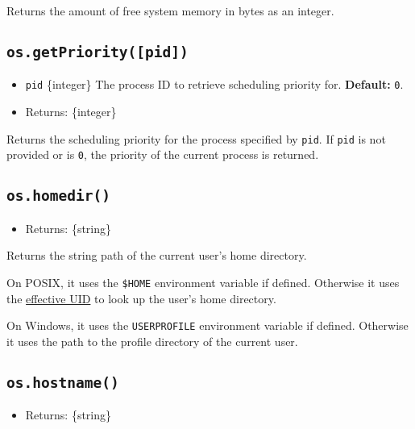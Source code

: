 Returns the amount of free system memory in bytes as an integer.

\subsection{\texorpdfstring{\texttt{os.getPriority({[}pid{]})}}{os.getPriority({[}pid{]})}}\label{os.getprioritypid}

\begin{itemize}
\tightlist
\item
  \texttt{pid} \{integer\} The process ID to retrieve scheduling
  priority for. \textbf{Default:} \texttt{0}.
\item
  Returns: \{integer\}
\end{itemize}

Returns the scheduling priority for the process specified by
\texttt{pid}. If \texttt{pid} is not provided or is \texttt{0}, the
priority of the current process is returned.

\subsection{\texorpdfstring{\texttt{os.homedir()}}{os.homedir()}}\label{os.homedir}

\begin{itemize}
\tightlist
\item
  Returns: \{string\}
\end{itemize}

Returns the string path of the current user's home directory.

On POSIX, it uses the \texttt{\$HOME} environment variable if defined.
Otherwise it uses the
\href{https://en.wikipedia.org/wiki/User_identifier\#Effective_user_ID}{effective
UID} to look up the user's home directory.

On Windows, it uses the \texttt{USERPROFILE} environment variable if
defined. Otherwise it uses the path to the profile directory of the
current user.

\subsection{\texorpdfstring{\texttt{os.hostname()}}{os.hostname()}}\label{os.hostname}

\begin{itemize}
\tightlist
\item
  Returns: \{string\}
\end{itemize}

